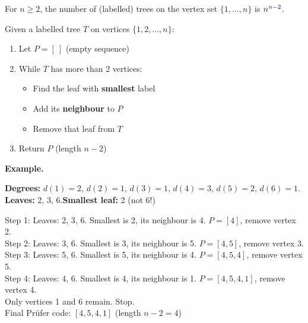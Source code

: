 \documentclass[8pt,a4paper,landscape]{extarticle}
\begin{document}
\begin{cscolumns}
\begin{theorem}[Cayley, 1889]
For $n\ge 2$, the number of (labelled) trees on the vertex set $\{1,\dots,n\}$ is ${\color{csBlue}n^{n-2}}$.
\end{theorem}
\begin{definition}
Given a labelled tree $T$ on vertices $\{1,2,\dots,n\}$:
\begin{enumerate}[label=\arabic*.]
\item Let $P=[\ ]$ (empty sequence)
\item While $T$ has more than 2 vertices:
\begin{itemize}
\item Find the leaf with \textbf{smallest} label
\item Add its \textbf{neighbour} to $P$
\item Remove that leaf from $T$
\end{itemize}
\item Return $P$ (length $n-2$)
\end{enumerate}
\end{definition}
\noindent\begin{minipage}[c]{0.36\linewidth}\textbf{Example.}\par\centering
{}
\end{minipage}\hfill
\begin{minipage}[c]{0.62\linewidth}
\textbf{Degrees:} $d(1)=2$, $d(2)=1$, $d(3)=1$, $d(4)=3$, $d(5)=2$, $d(6)=1$.\\
\textbf{Leaves:} 2, 3, 6.\quad\textbf{Smallest leaf:} 2 (not 6!)
\end{minipage}\par
Step 1: Leaves: 2, 3, 6. Smallest is 2, its neighbour is 4. $P=[4]$, remove vertex 2.\\
Step 2: Leaves: 3, 6. Smallest is 3, its neighbour is 5. $P=[4,5]$, remove vertex 3.\\
Step 3: Leaves: 5, 6. Smallest is 5, its neighbour is 4. $P=[4,5,4]$, remove vertex 5.\\
Step 4: Leaves: 4, 6. Smallest is 4, its neighbour is 1. $P=[4,5,4,1]$, remove vertex 4.\\
Only vertices 1 and 6 remain. Stop.\\
Final Pr\"ufer code: $[4,5,4,1]$ (length $n-2=4$)


\end{cscolumns}
\end{document}
